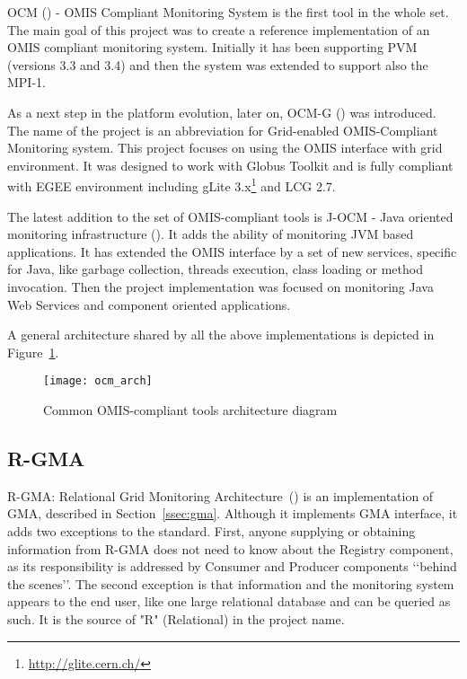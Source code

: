 OCM (\cite{RWspdt98, RW:ppam99b}) - OMIS Compliant Monitoring System is the first tool in the whole set. The main goal of this project was to create a reference implementation of an OMIS compliant monitoring system. Initially it has been supporting PVM (versions 3.3 and 3.4) and then the system was extended to support also the MPI-1.

As a next step in the platform evolution, later on, OCM-G (\cite{axgrid03b}) was introduced. The name of the project is an abbreviation for Grid-enabled OMIS-Compliant Monitoring system. This project focuses on using the OMIS interface with grid environment. It was designed to work with Globus Toolkit and is fully compliant with EGEE environment including gLite 3.x\footnote{\url{http://glite.cern.ch/}} and LCG 2.7.

The latest addition to the set of OMIS-compliant tools is J-OCM - Java oriented monitoring infrastructure (\cite{jocm}). It adds the ability of monitoring JVM based applications. It has extended the OMIS interface by a set of new services, specific for Java, like garbage collection, threads execution, class loading or method invocation. Then the project implementation was focused on monitoring Java Web Services and component oriented applications.

A general architecture shared by all the above implementations is depicted in Figure~\ref{fig:ocmg}.

\begin{figure}[ht]

\centering

\texttt{[image: ocm\_arch]} \caption{Common OMIS-compliant tools architecture diagram} \label{fig:ocmg}

\end{figure}


\subsection{R-GMA}

R-GMA: Relational Grid Monitoring Architecture~(\cite{RGMA1,RGMA2,RGMA3}) is an implementation of GMA, described in Section~\ref{ssec:gma}. Although it implements GMA interface, it adds two exceptions to the standard. First, anyone supplying or obtaining information from R-GMA does not need to know about the Registry component, as its responsibility is addressed by Consumer and Producer components \lq\lq{}behind the scenes\rq\rq{}. The second exception is that information and the monitoring system appears to the end user, like one large relational database and can be queried as such. It is the source of "R" (Relational) in the project name.

